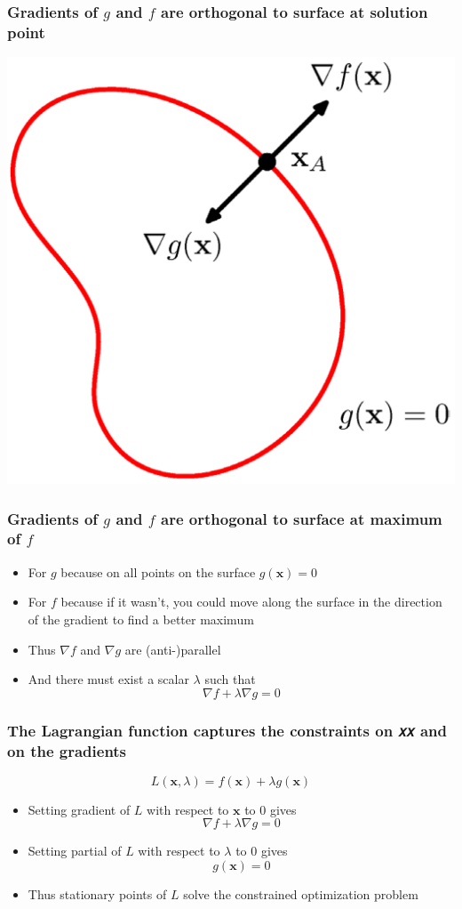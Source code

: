 \documentclass[12pt,notes,mathserif]{beamer}
\begin{document}
\begin{frame}[c]
\frametitle{Gradients of $g$ and $f$ are orthogonal to surface at solution point}
\begin{center}
\includegraphics[width=0.65\linewidth]{fig8/lec827.jpg}
\end{center}
\end{frame}



\begin{frame}[c]
\frametitle{Gradients of $g$ and $f$ are orthogonal to surface at maximum of $f$}
\begin{itemize}
\item For $g$ because on all points on the surface $g(\mathbf{x})=0$
\item For $f$ because if it wasn't, you could move along the surface in the direction of the gradient to find a better maximum
\item Thus $\nabla f$ and $\nabla g$ are (anti-)parallel
\item And there must exist a scalar $\lambda$ such that
\[
\nabla f+\lambda \nabla g=0
\]
\end{itemize}
\end{frame}

\begin{frame}[c]
\frametitle{The Lagrangian function captures the constraints on 𝑥𝑥 and on the gradients}
\[
L(\mathbf{x},\lambda)=f(\mathbf{x})+\lambda g(\mathbf{x})
\]
\begin{itemize}
\item Setting gradient of $L$ with respect to $\mathbf{x}$ to 0 gives
\[
\nabla f+\lambda \nabla g=0
\]
\item Setting partial of $L$ with respect to $\lambda$ to 0 gives
\[
g(\mathbf{x})=0
\]
\item Thus stationary points of $L$ solve the constrained optimization problem
\end{itemize}
\end{frame}
\end{document}
